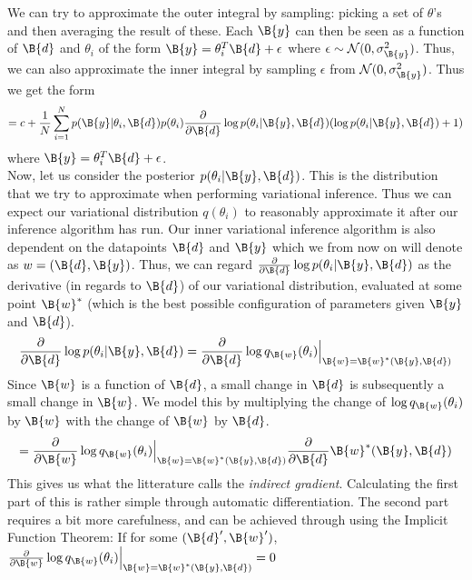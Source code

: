  We can try to approximate the outer integral by sampling: picking a set of $\theta$'s and then averaging the result of these.
Each $\B{y}$ can then be seen as a function of $\B{d}$ and $\theta_i$ of the form $\B{y}=\theta_i^T\B{d} + \epsilon$ where $\epsilon \sim \mathcal{N}(0, \sigma^2_\B{y})$.
Thus, we can also approximate the inner integral by sampling $\epsilon$ from $\mathcal{N}(0, \sigma^2_\B{y})$. Thus we get the form
$$= c + \frac{1}{N}\sum_{i=1}^Np(\B{y}|\theta_i, \B{d})p(\theta_i)\frac{\partial }{\partial \B{d}}\log p(\theta_i |\B{y}, \B{d})(\log p(\theta_i |\B{y}, \B{d}) + 1)
$$
where $\B{y}=\theta_i^T\B{d} + \epsilon$.\\
Now, let us consider the posterior $p(\theta_i|\B{y}, \B{d})$. This is the distribution that we try to approximate when performing variational inference. 
Thus we can expect our variational distribution $q(\theta_i)$ to reasonably approximate it after our inference algorithm has run.
Our inner variational inference algorithm is also dependent on the datapoints $\B{d}$ and $\B{y}$ which we from now on will denote as $w=(\B{d}, \B{y})$.
Thus, we can regard $\frac{\partial }{\partial \B{d}}\log p(\theta_i|\B{y}, \B{d})$ as
the derivative (in regards to $\B{d}$) of our variational distribution, evaluated at some point $\B{w}^*$ (which is the best possible configuration of parameters given $\B{y}$ and $\B{d}$).\\
$$\frac{\partial }{\partial \B{d}}\log p(\theta_i|\B{y}, \B{d}) = \frac{\partial }{\partial \B{d}}\log q_\B{w}(\theta_i)\Bigr\rvert_{\B{w} = \B{w}^*(\B{y}, \B{d})}$$
Since $\B{w}$ is a function of $\B{d}$, a small change in $\B{d}$ is subsequently a small change in $\B{w}$. 
We model this by multiplying the change of $\log q_\B{w}(\theta_i)$ by $\B{w}$ with the change of $\B{w}$ by $\B{d}$.
$$=\frac{\partial}{\partial \B{w}}\log q_\B{w}(\theta_i)\Bigr\rvert_{\B{w} = \B{w}^*(\B{y}, \B{d})}\frac{\partial}{\partial \B{d}}\B{w}^*(\B{y},\B{d})$$
This gives us what the litterature calls the \textit{indirect gradient}.
Calculating the first part of this is rather simple through automatic differentiation.
The second part requires a bit more carefulness, and can be achieved through using the Implicit Function Theorem:
If for some $(\B{d}', \B{w}')$, $\frac{\partial }{\partial \B{w}}\log q_\B{w} (\theta_i)\Bigr\rvert_{\B{w} = \B{w}^*(\B{y}, \B{d})} = 0$
